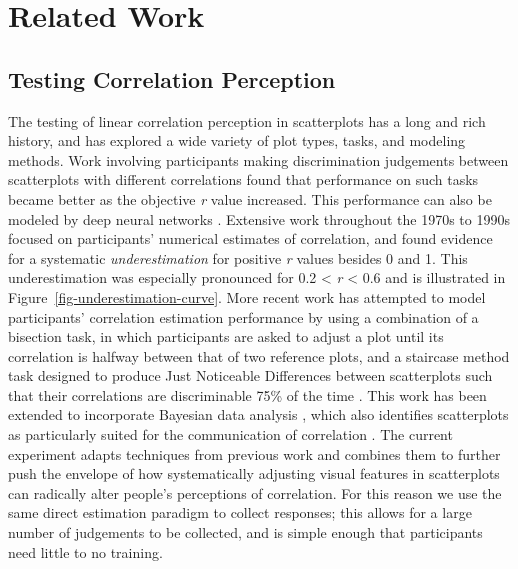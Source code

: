 \documentclass[manuscript, review, anonymous, screen]{acmart}
\begin{document}
\hypertarget{sec-related-work}{%
\section{Related Work}\label{sec-related-work}}

\hypertarget{sec-testing-corr-percept}{%
\subsection{Testing Correlation
Perception}\label{sec-testing-corr-percept}}

The testing of linear correlation perception in scatterplots has a long
and rich history, and has explored a wide variety of plot types, tasks,
and modeling methods. Work involving participants making discrimination
judgements between scatterplots with different correlations
\citep{pollack_1960, doherty_2007} found that performance on such tasks
became better as the objective \emph{r} value increased. This
performance can also be modeled by deep neural networks
\citep{yang_2023}. Extensive work throughout the 1970s to 1990s focused
on participants' numerical estimates of correlation, and found evidence
for a systematic \emph{underestimation} for positive \emph{r} values
besides 0 and 1. This underestimation was especially pronounced for 0.2
\textless{} \emph{r} \textless{} 0.6
\citep{strahan_1978, bobko_1979, cleveland_1982, lane_1985, lauer_1989, collyer_1990, meyer_1992}
and is illustrated in Figure~\ref{fig-underestimation-curve}. More
recent work has attempted to model participants' correlation estimation
performance by using a combination of a bisection task, in which
participants are asked to adjust a plot until its correlation is halfway
between that of two reference plots, and a staircase method task
designed to produce Just Noticeable Differences between scatterplots
such that their correlations are discriminable 75\% of the time
\citep{rensink_2010}. This work has been extended to incorporate
Bayesian data analysis \citep{kay_2015}, which also identifies
scatterplots as particularly suited for the communication of correlation
\citep{li_2010, harrison_2014}. The current experiment adapts techniques
from previous work \citep{strain_2023, strain_2023b} and combines them
to further push the envelope of how systematically adjusting visual
features in scatterplots can radically alter people's perceptions of
correlation. For this reason we use the same direct estimation paradigm
to collect responses; this allows for a large number of judgements to be
collected, and is simple enough that participants need little to no
training.
\end{document}
